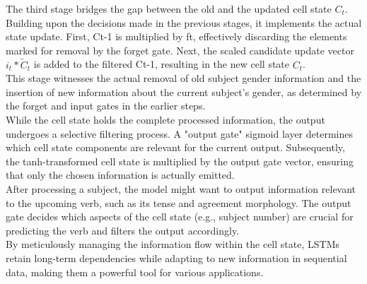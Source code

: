 The third stage bridges the gap between the old and the updated cell state $C_t$. Building upon the decisions made in the previous stages, it implements the actual state update. First, Ct-1 is multiplied by ft, effectively discarding the elements marked for removal by the forget gate. Next, the scaled candidate update vector $i_t * \tilde{C}_t$ is added to the filtered Ct-1, resulting in the new cell state $C_t$.\\
This stage witnesses the actual removal of old subject gender information and the insertion of new information about the current subject's gender, as determined by the forget and input gates in the earlier steps.\\
While the cell state holds the complete processed information, the output undergoes a selective filtering process. A "output gate" sigmoid layer determines which cell state components are relevant for the current output. Subsequently, the tanh-transformed cell state is multiplied by the output gate vector, ensuring that only the chosen information is actually emitted.\\
After processing a subject, the model might want to output information relevant to the upcoming verb, such as its tense and agreement morphology. The output gate decides which aspects of the cell state (e.g., subject number) are crucial for predicting the verb and filters the output accordingly.\\
By meticulously managing the information flow within the cell state, LSTMs retain long-term dependencies while adapting to new information in sequential data, making them a powerful tool for various applications.


